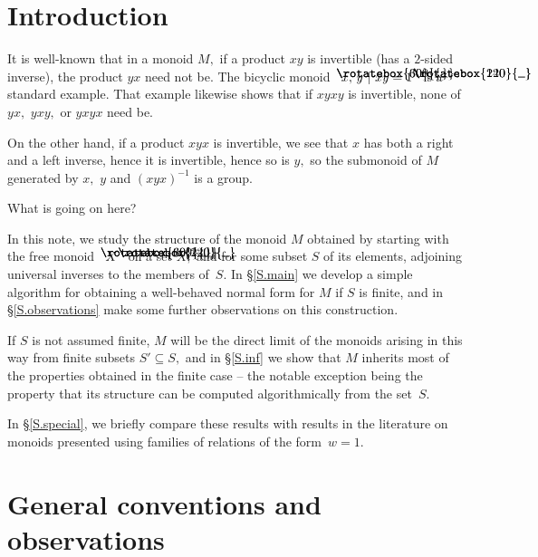 \documentclass{amsart}
\numberwithin{equation}{section}
\newcommand{\langl}{\begin{picture}(.51em,1em)
\put(.11em,.33em){\rotatebox{60}{\line(1,0){.55em}}}
\put(.11em,.33em){\rotatebox{300}{\line(1,0){.55em}}}
\end{picture}}
\newcommand{\rangl}{\begin{picture}(.5em,1em)
\put(.09em,.33em){\rotatebox{120}{\line(1,0){.55em}}}
\put(.09em,.33em){\rotatebox{240}{\line(1,0){.55em}}}
\end{picture}}
\begin{document}
\section{Introduction}\label{S.intro}

It is well-known that in a monoid $M,$ if a product $xy$
is invertible (has a $\!2\!$-sided inverse), the
product $yx$ need not be.
The bicyclic monoid $\langl x,\,y~|~xy=1\rangl$
is a standard example.
That example likewise shows that if $xyxy$ is invertible, none
of $yx,$ $yxy,$ or $yxyx$ need be.

On the other hand, if a product $xyx$ is invertible, we see
that $x$ has both a right and a left inverse, hence it
is invertible, hence so is $y,$ so the submonoid
of $M$ generated by $x,$ $y$ and $(xyx)^{-1}$ is a group.

What is going on here?

In this note, we study the structure of the monoid $M$ obtained by
starting with the free monoid $\langl X\rangl$ on a set $X,$ and
for some subset $S$ of its elements, adjoining universal inverses
to the members of~$S.$
In \S\ref{S.main} we develop a simple algorithm for
obtaining a well-behaved normal form for $M$ if $S$ is finite,
and in \S\ref{S.observations} make some further observations
on this construction.

If $S$ is not assumed finite, $M$ will be the direct
limit of the monoids arising in this way from finite subsets
$S'\subseteq S,$ and in \S\ref{S.inf} we show that $M$
inherits most of the properties obtained in the finite case
-- the notable exception being the property that its structure
can be computed algorithmically from the set~$S.$

In \S\ref{S.special}, we briefly compare these results
with results in the literature on monoids presented using
families of relations of the form~$w=1.$

\section{General conventions and observations}\label{S.easy}
\end{document}
